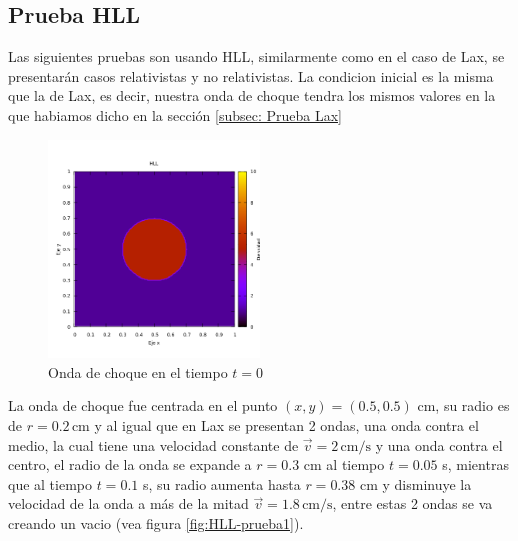 \documentclass[12pt,a4paper]{book}
\begin{document}



\subsection{Prueba HLL}
Las siguientes pruebas son usando HLL, similarmente como en el caso de Lax, se presentarán casos relativistas y no relativistas. La condicion inicial es la misma que la de Lax, es decir, nuestra onda de choque tendra los mismos valores en la que habiamos dicho en la sección \ref{subsec: Prueba Lax}	

\begin{figure}[H]
\centering
\includegraphics[width=0.5\textwidth]{./Figuras/Pruebas/Prueba_onda_choque/onda_choque3_t_0}
\caption{Onda de choque en el tiempo $t = 0$} \label{fig:onda_choque3_t_0}
\end{figure}

La onda de choque fue centrada en el punto $(x,y)=(0.5,0.5)$ cm, su radio es de $r = 0.2 \, \mathrm{cm}$ y al igual que en Lax se presentan 2 ondas, una onda contra el medio, la cual tiene una velocidad constante de $\vec{v}  = 2 \, \mathrm{cm}/\mathrm{s}$ y una onda contra el centro, el radio de la onda se expande a $r = 0.3$ cm al tiempo $t=0.05$ s, mientras que al tiempo $t = 0.1$ s, su radio aumenta hasta $r = 0.38$ cm y disminuye la velocidad de la onda a más de la mitad $\vec{v}=1.8 \, \mathrm{cm}/\mathrm{s}$, entre estas 2 ondas se va creando un vacio (vea figura \ref{fig:HLL-prueba1}).
\end{document}
